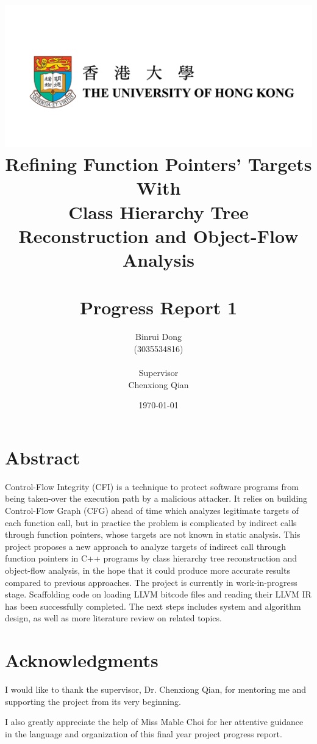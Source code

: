 \documentclass[a4paper,12pt]{report}
\title{\includegraphics[keepaspectratio,width=0.5\paperwidth]{img/hku.png} \\ Refining Function Pointers’ Targets With\\ Class Hierarchy Tree Reconstruction and Object-Flow Analysis\\ \  \\Progress Report 1}
\author{Binrui Dong\\ (3035534816)\\ \ \\ Supervisor\\ Chenxiong Qian}
\date{\today}
\begin{document}
\maketitle

\newpage
\chapter*{Abstract}
\label{chapter:abstract}

Control-Flow Integrity (CFI) is a technique to protect software programs from being taken-over the execution path by a malicious attacker. It relies on building Control-Flow Graph (CFG) ahead of time which analyzes legitimate targets of each function call, but in practice the problem is complicated by indirect calls through function pointers, whose targets are not known in static analysis. This project proposes a new approach to analyze targets of indirect call through function pointers in C++ programs by class hierarchy tree reconstruction and object-flow analysis, in the hope that it could produce more accurate results compared to previous approaches. The project is currently in work-in-progress stage. Scaffolding code on loading LLVM bitcode files and reading their LLVM IR has been successfully completed. The next steps includes system and algorithm design, as well as more literature review on related topics.

\chapter*{Acknowledgments}
\label{chapter:acknowledgments}

I would like to thank the supervisor, Dr. Chenxiong Qian, for mentoring me and supporting the project from its very beginning.

I also greatly appreciate the help of Miss Mable Choi for her attentive guidance in the language and organization of this final year project progress report.

\newpage

\tableofcontents

\newpage

\listoffigures
{}

\listoftables
{}

\printacronyms[include=abbrev,name=Abbreviations]

\newpage


\newpage


\newpage


\newpage


\newpage


\newpage

\printbibliography[heading=bibintoc,title={References}]

\appendix

\end{document}
